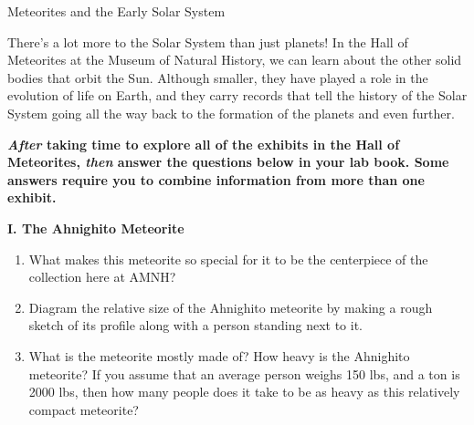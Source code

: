 \documentclass[10pt]{article}%
\begin{document}
\begin{center}
\huge Meteorites and the Early Solar System
\end{center}

\vspace{0.3cm}

\begin{flushleft}

There's a lot more to the Solar System than just planets! In the Hall of
Meteorites at the Museum of Natural History, we can learn about the other solid
bodies that orbit the Sun. Although smaller, they have played a role in the
evolution of life on Earth, and they carry records that tell the history of the
Solar System going all the way back to the formation of the planets and even
further.  

\vspace{0.3cm}

\textbf{\emph{After} taking time to explore all of the exhibits in the 
Hall of Meteorites, 
\emph{then} answer the questions below in your lab book. Some answers require 
you to combine information from more than one exhibit.} 

\vspace{0.3cm}

\begin{center}
\textbf{I. The Ahnighito Meteorite}
\end{center}

\vspace{0.3cm}

\begin{enumerate}
\item What makes this meteorite so special for it to be the centerpiece of the 
collection here at AMNH?

\vspace{0.3cm}

\item Diagram the relative size of the Ahnighito meteorite by making a rough
sketch of its profile along with a person standing next to it. 

\vspace{0.3cm}

\item What is the meteorite mostly made of?  How heavy is the Ahnighito meteorite?
If you assume that an average person weighs 150 lbs, and a ton is 2000 lbs, then
how many people does it take to be as heavy as this relatively compact 
meteorite?

\vspace{0.3cm}


\end{enumerate}
\end{flushleft}
\end{document}
